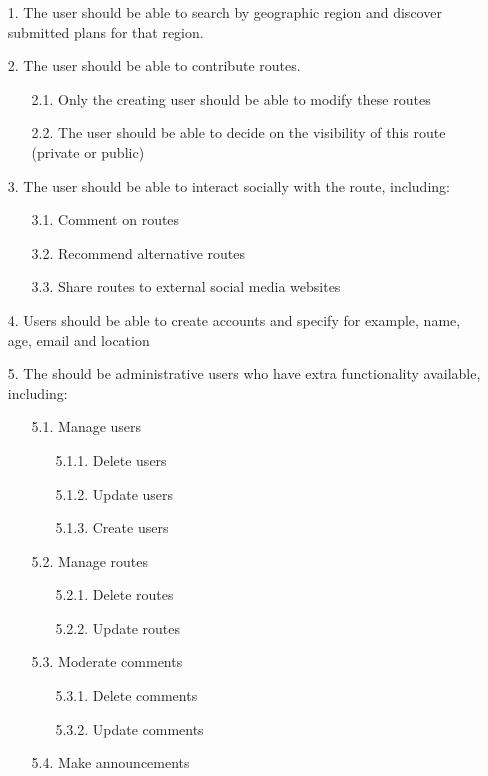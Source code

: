 \documentclass[a4paper,twoside,notitlepage,11pt]{article}
\begin{document}
 \begin{enumerate}
 \item[1.] The user should be able to search by geographic region and discover submitted plans for that region.
 \item[2.] The user should be able to contribute routes.
 	\begin{enumerate}
 	\item[2.1.] Only the creating user should be able to modify these routes
 	\item[2.2.] The user should be able to decide on the visibility of this route (private or public)
 	\end{enumerate}
 \item[3.] The user should be able to interact socially with the route, including:
 	\begin{enumerate}
 	\item[3.1.] Comment on routes
 	\item[3.2.] Recommend alternative routes
 	\item[3.3.] Share routes to external social media websites
 	\end{enumerate}
 \item[4.] Users should be able to create accounts and specify for example, name, age, email and location 
 \item[5.] The should be administrative users who have extra functionality available, including:
	 \begin{enumerate}
 		\item[5.1.] Manage users
 		\begin{enumerate}
 			\item[5.1.1.] Delete users
 			\item[5.1.2.] Update users
 			\item[5.1.3.] Create users
 		\end{enumerate}
 		\item[5.2.] Manage routes
 		\begin{enumerate}
 			\item[5.2.1.] Delete routes
 			\item[5.2.2.] Update routes
 		\end{enumerate}
 		\item[5.3.] Moderate comments
 		\begin{enumerate}
 			\item[5.3.1.] Delete comments
			\item[5.3.2.] Update comments
 		\end{enumerate}
 		\item[5.4.] Make announcements

\end{enumerate}
\end{enumerate}
\end{document}
